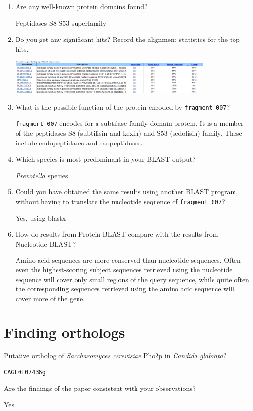\documentclass[a4paper,11pt]{article}
\begin{document}
\begin{enumerate}
\item Are any well-known protein domains found? 

Peptidases S8 S53 superfamily

\item Do you get any significant hits? Record the alignment statistics for the top hits. 

\vspace{0.5cm}
\begin{center}
\includegraphics[width=0.8\textwidth]{blastp.png}
\end{center}
\vspace{0.5cm}

\item What is the possible function of the protein encoded by \texttt{fragment\_007}?

\texttt{fragment\_007} encodes for a subtilase family domain protein. It is a member of the peptidases S8 (subtilisin and kexin) and S53 (sedolisin) family. These include endopeptidases and exopeptidases.

\item Which species is most predominant in your BLAST output?

\emph{Prevotella} species

\item Could you have obtained the same results using another BLAST program, without having to translate the nucleotide sequence of \texttt{fragment\_007}?

Yes, using blastx

\item How do results from Protein BLAST compare with the results from Nucleotide BLAST?

Amino acid sequences are more conserved than nucleotide sequences. Often even the highest-scoring subject sequences retrieved using the nucleotide sequence will cover only small regions of the query sequence, while quite often the corresponding sequences retrieved using the amino acid sequence will cover more of the gene.

\end{enumerate}

\section{Finding orthologs}

Putative ortholog of \emph{Saccharomyces cerevisiae} Pho2p in \emph{Candida glabrata}?

\texttt{CAGL0L07436g}

Are the findings of the paper consistent with your observations?

Yes
\end{document}
